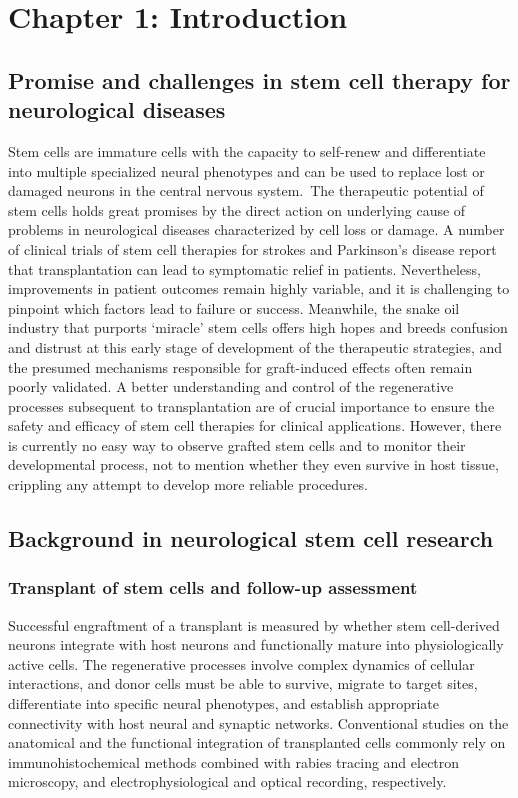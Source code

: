 \newpage
\section{Chapter 1: Introduction}

\subsection{Promise and challenges in stem cell  therapy for neurological diseases}

Stem cells  are immature cells with the capacity to self-renew and differentiate into  multiple specialized neural phenotypes and can be used to replace lost or  damaged neurons in the central nervous system. The therapeutic potential of stem cells  holds great promises by the direct action on underlying cause of problems in  neurological diseases characterized by cell loss or damage. A number of clinical trials of stem cell therapies for strokes  and Parkinson's disease report that transplantation can lead to symptomatic  relief in patients. Nevertheless, improvements in patient outcomes remain  highly variable, and it is challenging to pinpoint which factors lead to  failure or success. Meanwhile, the snake oil industry that purports ‘miracle’  stem cells offers high hopes and breeds confusion and distrust at this early  stage of development of the therapeutic strategies, and the presumed mechanisms  responsible for graft-induced effects often remain poorly validated. A better  understanding and control of the regenerative processes subsequent to  transplantation are of crucial importance to ensure the safety and efficacy of  stem cell therapies for clinical applications. However, there is currently no  easy way to observe grafted stem cells and to monitor their developmental  process, not to mention whether they even survive in host tissue, crippling any  attempt to develop more reliable procedures.

\subsection{Background in neurological stem cell  research}

\subsubsection{Transplant of stem cells and follow-up assessment}

Successful  engraftment of a transplant is measured by whether stem cell-derived neurons  integrate with host neurons and functionally mature into physiologically active  cells. The regenerative processes involve complex dynamics of cellular  interactions, and donor cells must be able to survive, migrate to target sites,  differentiate into specific neural phenotypes, and establish appropriate  connectivity with host neural and synaptic networks. Conventional studies on  the anatomical and the functional integration of transplanted cells commonly  rely on immunohistochemical methods combined with rabies tracing and electron  microscopy, and electrophysiological and optical recording, respectively. 

